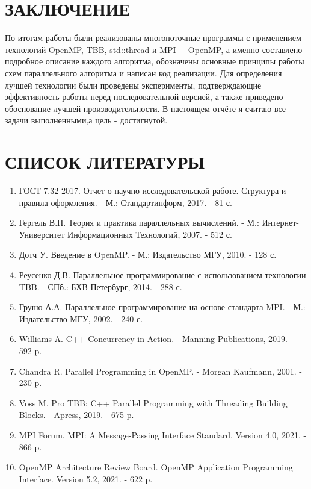\documentclass[14pt,a4paper]{article}
\begin{document}
\section{ЗАКЛЮЧЕНИЕ}
По итогам работы были реализованы многопоточные программы с применением технологий
OpenMP, TBB, std::thread и MPI + OpenMP, а именно составлено подробное описание каждого алгоритма, обозначены основные принципы работы схем параллельного алгоритма и написан код реализации. Для определения лучшей технологии были проведены эксперименты, подтверждающие эффективность работы перед последовательной версией, а также приведено обоснование лучшей производительности. В настоящем отчёте я считаю все задачи выполненными,а цель - достигнутой. 

\newpage

\section{СПИСОК ЛИТЕРАТУРЫ}

\begin{enumerate}
\item ГОСТ 7.32-2017. Отчет о научно-исследовательской работе. Структура и правила оформления. - М.: Стандартинформ, 2017. - 81 с.

\item Гергель В.П. Теория и практика параллельных вычислений. - М.: Интернет-Университет Информационных Технологий, 2007. - 512 с.

\item Дотч У. Введение в OpenMP. - М.: Издательство МГУ, 2010. - 128 с.

\item Реусенко Д.В. Параллельное программирование с использованием технологии TBB. - СПб.: БХВ-Петербург, 2014. - 288 с.

\item Грушо А.А. Параллельное программирование на основе стандарта MPI. - М.: Издательство МГУ, 2002. - 240 с.

\item Williams A. C++ Concurrency in Action. - Manning Publications, 2019. - 592 p.

\item Chandra R. Parallel Programming in OpenMP. - Morgan Kaufmann, 2001. - 230 p.

\item Voss M. Pro TBB: C++ Parallel Programming with Threading Building Blocks. - Apress, 2019. - 675 p.

\item MPI Forum. MPI: A Message-Passing Interface Standard. Version 4.0, 2021. - 866 p.

\item OpenMP Architecture Review Board. OpenMP Application Programming Interface. Version 5.2, 2021. - 622 p.
\end{enumerate}
\end{document}
